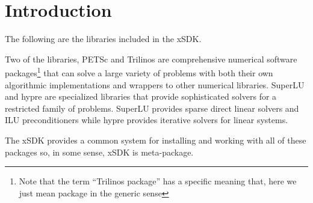 \chapter*{Introduction}
The following are the libraries included in the xSDK.

Two of the libraries, PETSc and Trilinos are comprehensive numerical
software packages\footnote{Note that the term ``Trilinos package'' has
  a specific meaning that, here we just mean package in the generic
  sense} that can solve a large variety of problems with both their
own algorithmic implementations and wrappers to other numerical
libraries. SuperLU and hypre are specialized libraries that provide
sophisticated solvers for a restricted family of problems. SuperLU
provides sparse direct linear solvers and ILU preconditioners while
hypre provides iterative solvers for linear systems.

The xSDK provides a common system for installing and working with all of these
packages so, in some sense, xSDK is meta-package.









